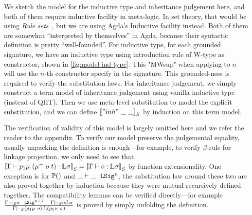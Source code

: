 We sketch the model for the inductive type and inheritance judgement here, and both of them require inductive facility in meta-logic. In set theory, that would be using \textit{Rule sets}~\cite{timany2017consistency,aczel1998relating}, but we are using Agda's Inductive facility instead. Both of them are somewhat ``interpreted by themselves'' in Agda, because their syntactic definition is pretty ``well-founded''. For inductive type, for each grounded signature, we have an inductive type using introduction rule of W-type as constructor, shown in \cref{fig:model-ind-type}. This "MWsup" when applying to $n$ will use the $n$-th constructor specify in the signature. This grounded-ness is required to verify the substitution laws. For inheritance judgement, we simply construct a term model of inheritance judgement using vanilla inductive type (instead of QIIT). Then we use meta-level substitution to model the explicit substitution, and we can define ${\llbracket {"inh"~\_ ~\_} \rrbracket}_S$ by induction on this term model. 



The verification of validity of this model is largely omitted here and we refer the reader to the appendix. To verify our model preserve the judgemental equality, usually unpacking the definition is enough---for example, to verify $\beta$-rule for linkage projection, we only need to see that ${\llbracket {\ensuremath{ {\Gamma} \vdash {p_1\mu~(\mu^+~o~t)} : {\mathbb{L}\sigma} }} \rrbracket}_S = {\llbracket {\ensuremath{ {\Gamma} \vdash {o} : {\mathbb{L}\sigma} }} \rrbracket}_S$ by function extensionality. One exception is for $\mathbb{P}({})$ and $ {\_} \vdash {\_} \ \ \texttt{LSig}^{n} $, the substitution law around these two are also proved together by induction because they were mutual-recursively defined together. The compatibility lemmas can be verified directly---for example $\frac{{ {\Gamma} \models_S {\sigma} \ \ \texttt{LSig}^{n+1} }\quad{ {\ensuremath{\Gamma}} \models_S {o} : {\ensuremath{\mathbb{L}}\sigma} }}{{ {\Gamma} \models_S {(p_1\mu~o)} : {\mathbb{L}(p_1\nu~\sigma)} }}$ is proved by simply unfolding the definition.



